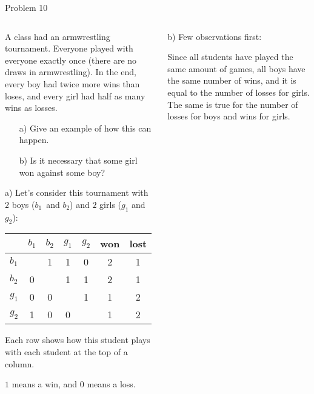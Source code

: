 \documentclass[9pt,aspectratio=169]{beamer}
\begin{document}
\begin{frame}{Problem 10}
  \begin{columns}[T]
    \begin{column}{0.5\textwidth}
      \begin{problem}
        A class had an armwrestling tournament. Everyone played with everyone exactly once (there are no draws in armwrestling). In the end, every boy had twice more wins than loses, and every girl had half as many wins as losses.
        \vspace*{-0.7ex}
        \begin{enumerate}
          \setlength{\itemsep}{0pt}
          \item[a)] Give an example of how this can happen.

          \item[b)] Is it necessary that some girl won against some boy?
        \end{enumerate}
        \vspace*{-0.7ex}
      \end{problem}
      a) Let's consider this tournament with $2$ boys ($b_1$~and $b_2$) and $2$ girls ($g_1$ and $g_2$):
      \begin{center}
        \vspace*{-0.5ex}
        \begin{tabular}{|l||c|c|c|c||c|c|}
          \hline 
          & $b_1$ & $b_2$ & $g_1$ & $g_2$ & won & lost \\\hline\hline
          $b_1$\vphantom{$b_1^1$} &  & 1 & 1 & 0 & 2 & 1 \\\hline 
          $b_2$\vphantom{$b_1^1$} & 0 &  & 1 & 1 & 2 & 1 \\\hline 
          $g_1$\vphantom{$b_1^1$} & 0 & 0 &  & 1 & 1 & 2 \\\hline 
          $g_2$\vphantom{$b_1^1$} & 1 & 0 & 0 &  & 1 & 2 \\\hline
        \end{tabular}
        \vspace*{-0.5ex}
      \end{center}
      Each row shows how this student plays with each student at the top of a column. 
      
      $1$ means a win, and $0$ means a loss.

    \end{column}
    \begin{column}{0.5\textwidth}
      \small
      b) Few observations first:

      Since all students have played the same amount of games, all boys have the same number of wins, and it is equal to the number of losses for girls. The same is true for the number of losses for boys and wins for girls.
      \smallskip
      

\end{column}
\end{columns}
\end{frame}
\end{document}
